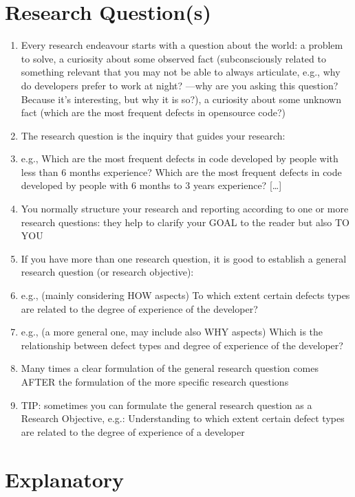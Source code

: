 \documentclass[conference, compsoc, twoside]{IEEEtran}
\begin{document}
\section{Research Question(s)} %
\begin{enumerate}
	\item Every research endeavour starts with a question about the world: a problem to solve, a curiosity about some
observed fact (subconsciously related to something relevant that you may not be able to always articulate, e.g.,
why do developers prefer to work at night? —why are you asking this question? Because it’s interesting, but why
it is so?), a curiosity about some unknown fact (which are the most frequent defects in opensource code?)
\item The research question is the inquiry that guides your research:
\item e.g., Which are the most frequent defects in code developed by people with less than 6 months experience?
Which are the most frequent defects in code developed by people with 6 months to 3 years experience? […]
\item You normally structure your research and reporting according to one or more research questions: they help to
clarify your GOAL to the reader but also TO YOU
\item If you have more than one research question, it is good to establish a general research question (or research
objective):
\item e.g., (mainly considering HOW aspects) To which extent certain defects types are related to the degree of
experience of the developer?
\item e.g., (a more general one, may include also WHY aspects) Which is the relationship between defect types and degree of experience of the developer?
\item Many times a clear formulation of the general research question comes AFTER the formulation of the more specific research questions
\item TIP: sometimes you can formulate the general research question as a Research Objective, e.g.: Understanding to which extent certain defect types are related to the degree of experience of a developer
\end{enumerate}
\section{Explanatory} %
\label{sec:explanatory}
\end{document}
